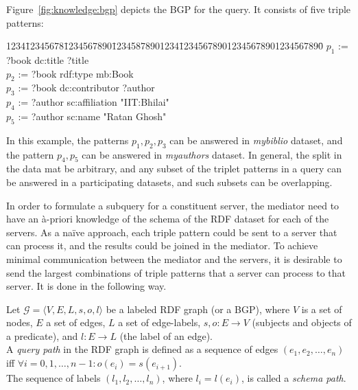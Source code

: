\noindent
Figure~\ref{fig:knowledge:bgp} depicts the BGP for the query. It consists of five triple patterns:
\begin{tabbing}
	1234\=12345678\=1234567890\=12345878901234\=123456789012345678901234567890\=\kill
	\> $p_1$ := \> ?book \> dc:title \> ?title   \\
	\> $p_2$ := \> ?book  \> rdf:type \> mb:Book \\
        \> $p_3$ := \> ?book  \> dc:contributor \> ?author \\
        \> $p_4$ := \> ?author \> sc:affiliation \> "IIT:Bhilai" \\
	\> $p_5$ := \> ?author \> sc:name \>  "Ratan Ghosh"  \\
\end{tabbing}
\noindent
In this example, the patterns $p_1,p_2,p_3$ can be answered in {\it mybiblio} dataset, and the pattern $p_4,p_5$ can be answered
in {\it myauthors} dataset. In general, the split in the data mat be arbitrary, and any subset of the triplet patterns in a query 
can be answered in a participating datasets, and such subsets can be overlapping.  

In order to formulate a subquery for a constituent server, the mediator need to have an \`{a}-priori knowledge of the schema
of the RDF dataset for each of the servers. As a na\"{i}ve approach, each triple pattern could be sent to a server that can
process it, and the results could be joined in the mediator. To achieve minimal communication between the mediator and the 
servers, it is desirable to send the largest combinations of triple patterns that a server can process to that server. 
It is done in the following way.

\begin{definition} 
	Let $\mathcal{G} = \langle V, E, L, s, o, l \rangle$ be a labeled RDF graph (or a BGP), where $V$ is a set of nodes, $E$ a set of 
	edges, $L$ a set of edge-labels, $s,o : E \rightarrow V$ (subjects and objects of a predicate), and $l : E \rightarrow L$
	(the label of an edge). \\
	\noindent
	A {\em query path} in the RDF graph is defined as a sequence of edges $(e_1, e_2, \dots, e_n)$ iff 
	$\forall i = 0, 1, \dots, n-1: o(e_i) = s(e_{i+1})$.\\ 
	\noindent
	The sequence of labels $(l_1, l_2, \dots, l_n)$, where $l_i = l(e_i)$, is called a {\em schema path}. 
\end{definition}

